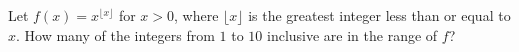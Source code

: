 Let $f(x)=x^{\lfloor x\rfloor}$ for $x>0$, where $\lfloor x\rfloor$ is the greatest integer less than or equal to $x$. How many of the integers from $1$ to $10$ inclusive are in the range of $f$?
